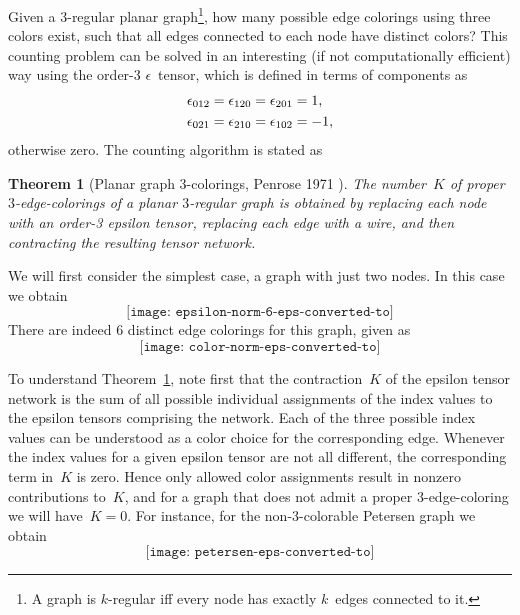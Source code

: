\documentclass[aps,pra,12pt,nofootinbib,superscriptaddress,longbibliography]{revtex4-1}
\newcommand{\vb}[1]{}
\theoremstyle{plain}
\newtheorem{theorem}{Theorem}
\theoremstyle{definition}
\newcommand{\be}{\begin{equation}}
\newcommand{\ee}{\end{equation}}
\begin{document}
Given a $3$-regular planar graph\footnote{A graph is $k$-regular iff every node has exactly $k$~edges connected to it.},
how many possible edge colorings using three colors exist,
such that all edges connected to each node have distinct colors?
This counting problem can be solved in an interesting (if not computationally efficient) way
using the order-3 $\epsilon$~tensor, which is defined in terms of components as
\begin{align}
\notag
 &\epsilon_{012} = \epsilon_{120} = \epsilon_{201} = 1,\\
 &\epsilon_{021} = \epsilon_{210} = \epsilon_{102} = -1,
\end{align}
otherwise zero. The counting algorithm is stated as
\begin{theorem}[Planar graph $3$-colorings, Penrose 1971 \cite{Penrose}]\label{thm:3-color}
The number~$K$ of proper $3$-edge-colorings of a planar $3$-regular graph
is obtained by replacing each node with an order-3 epsilon tensor,
replacing each edge with a wire,
and then contracting the resulting tensor network.
\end{theorem}

\begin{comment}
There are many interesting diagrammatic relations of order-3 epsilon tensors, including the delta-to-y relationship. 
\be 
\texttt{[image: delta-2-y]}
\ee
\end{comment}

We will first consider the simplest case, a graph with just two nodes.
In this case we obtain
\be 
\texttt{[image: epsilon-norm-6-eps-converted-to]}
\ee 
There are indeed $6$ distinct edge colorings for this graph, given as
\be
\texttt{[image: color-norm-eps-converted-to]} 
\ee

To understand Theorem~\ref{thm:3-color},
note first that the contraction~$K$ of the epsilon tensor network is the sum of all possible individual assignments of the index values
to the epsilon tensors comprising the network.
Each of the three possible index values can be understood as a color choice for the corresponding edge.
Whenever the index values for a given epsilon tensor are not all different, the corresponding term in~$K$ is zero.
Hence only allowed color assignments result in nonzero contributions to~$K$,
and for a graph that does not admit a proper $3$-edge-coloring we will have~$K=0$.
For instance, for the non-$3$-colorable Petersen graph we obtain
\be
\texttt{[image: petersen-eps-converted-to]}
\ee 
\end{document}
